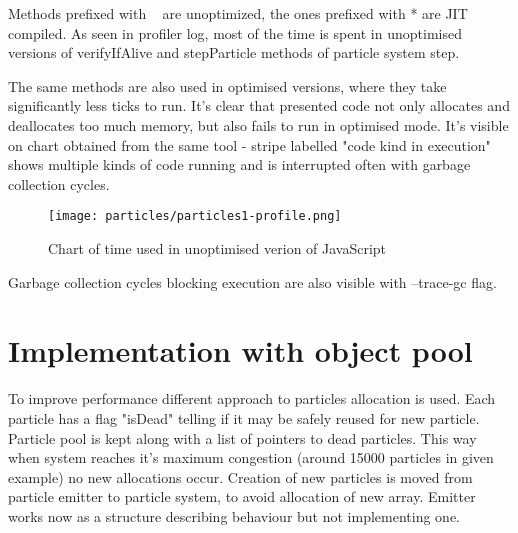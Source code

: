 Methods prefixed with ~ are unoptimized, the ones prefixed with * are JIT compiled. As seen in profiler log, most of the time is spent in unoptimised versions of verifyIfAlive and stepParticle methods of particle system step.



The same methods are also used in optimised versions, where they take significantly less ticks to run. It's clear that presented code not only allocates and deallocates too much memory, but also fails to run in optimised mode. It's visible on chart obtained from the same tool - stripe labelled "code kind in execution" shows multiple kinds of code running and is interrupted often with garbage collection cycles.

\begin{figure}[h!]
  \caption{Chart of time used in unoptimised verion of JavaScript}
  \label{img:particles1profile}
  \centering
	\texttt{[image: particles/particles1-profile.png]}
\end{figure}

Garbage collection cycles blocking execution are also visible with --trace-gc flag.



\section{Implementation with object pool}
\label{sec:particlesobjectpool}

To improve performance different approach to particles allocation is used. Each particle has a flag "isDead" telling if it may be safely reused for new particle. Particle pool is kept along with a list of pointers to dead particles. This way when system reaches it's maximum congestion (around 15000 particles in given example) no new allocations occur.
Creation of new particles is moved from particle emitter to particle system, to avoid allocation of new array. Emitter works now as a structure describing behaviour but not implementing one.




